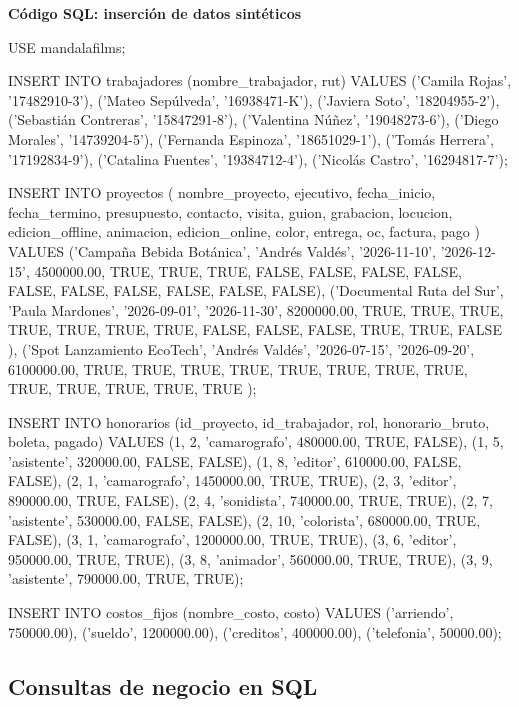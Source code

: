\documentclass[11pt,letterpaper]{article}
\newcommand{\rotuloSQL}[1]{\par\noindent\textcolor{azulPrimario}{\bfseries #1}\par\vspace{-2pt}}
\begin{document}
\rotuloSQL{Código SQL: inserción de datos sintéticos}
\begin{SQL}
USE mandalafilms;

INSERT INTO trabajadores (nombre_trabajador, rut) VALUES
('Camila Rojas', '17482910-3'),
('Mateo Sepúlveda', '16938471-K'),
('Javiera Soto', '18204955-2'),
('Sebastián Contreras', '15847291-8'),
('Valentina Núñez', '19048273-6'),
('Diego Morales', '14739204-5'),
('Fernanda Espinoza', '18651029-1'),
('Tomás Herrera', '17192834-9'),
('Catalina Fuentes', '19384712-4'),
('Nicolás Castro', '16294817-7');

INSERT INTO proyectos (
nombre_proyecto, ejecutivo, fecha_inicio, fecha_termino, presupuesto, contacto, visita, guion, grabacion, locucion, edicion_offline, animacion, edicion_online, color, entrega, oc, factura, pago ) VALUES
('Campaña Bebida Botánica', 'Andrés Valdés', '2026-11-10', '2026-12-15', 4500000.00, TRUE, TRUE, TRUE, FALSE, FALSE, FALSE, FALSE, FALSE, FALSE, FALSE, FALSE, FALSE, FALSE),
('Documental Ruta del Sur', 'Paula Mardones', '2026-09-01', '2026-11-30', 8200000.00, TRUE, TRUE, TRUE, TRUE, TRUE, TRUE, TRUE, FALSE, FALSE, FALSE, TRUE, TRUE, FALSE ),
('Spot Lanzamiento EcoTech', 'Andrés Valdés', '2026-07-15', '2026-09-20', 6100000.00, TRUE, TRUE, TRUE, TRUE, TRUE, TRUE, TRUE, TRUE, TRUE, TRUE, TRUE, TRUE, TRUE );

INSERT INTO honorarios (id_proyecto, id_trabajador, rol, honorario_bruto, boleta, pagado) VALUES
(1, 2, 'camarografo',  480000.00, TRUE,  FALSE),
(1, 5, 'asistente',    320000.00, FALSE, FALSE),
(1, 8, 'editor',       610000.00, FALSE, FALSE),
(2, 1, 'camarografo', 1450000.00, TRUE,  TRUE),
(2, 3, 'editor',       890000.00, TRUE,  FALSE),
(2, 4, 'sonidista',    740000.00, TRUE,  TRUE),
(2, 7, 'asistente',    530000.00, FALSE, FALSE),
(2, 10, 'colorista',   680000.00, TRUE,  FALSE),
(3, 1, 'camarografo', 1200000.00, TRUE,  TRUE),
(3, 6, 'editor',       950000.00, TRUE,  TRUE),
(3, 8, 'animador',     560000.00, TRUE,  TRUE),
(3, 9, 'asistente',    790000.00, TRUE,  TRUE);

INSERT INTO costos_fijos (nombre_costo, costo) VALUES
('arriendo', 750000.00),
('sueldo', 1200000.00),
('creditos', 400000.00),
('telefonia', 50000.00);
\end{SQL}


\subsection{Consultas de negocio en SQL}
\end{document}
